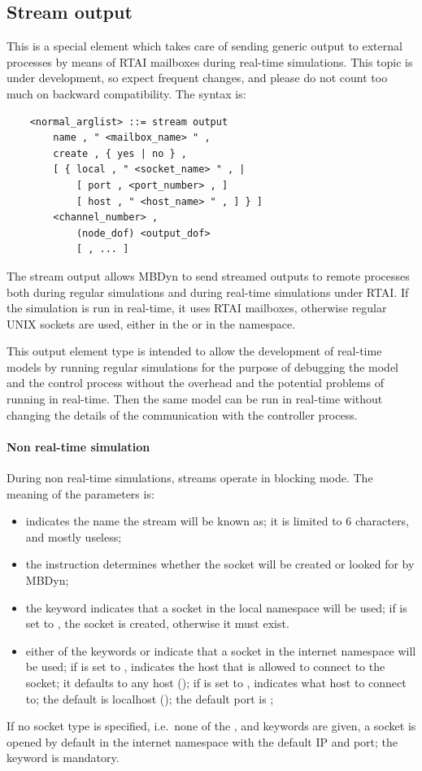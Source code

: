 \subsection{Stream output}\label{sec:STREAM_OUTPUT}
This is a special element which takes care of sending generic output
to external processes by means of RTAI mailboxes during real-time 
simulations.
This topic is under development, so expect frequent changes, and
please do not count too much on backward compatibility.
The syntax is:
\begin{verbatim}
    <normal_arglist> ::= stream output
        name , " <mailbox_name> " ,
        create , { yes | no } ,
        [ { local , " <socket_name> " , |
            [ port , <port_number> , ]
            [ host , " <host_name> " , ] } ]
        <channel_number> ,
            (node_dof) <output_dof>
            [ , ... ]
\end{verbatim}
The stream output allows MBDyn to send streamed outputs 
to remote processes both during regular simulations and during 
real-time simulations under RTAI.
If the simulation is run in real-time, it uses RTAI mailboxes, 
otherwise regular UNIX sockets are used, either in the  or 
in the  namespace.

This output element type is intended to allow the development 
of real-time models by running regular simulations for the purpose 
of debugging the model and the control process without the overhead 
and the potential problems of running in real-time.
Then the same model can be run in real-time without changing the details
of the communication with the controller process.

\paragraph{Non real-time simulation}
During non real-time simulations, streams operate in blocking mode.
The meaning of the parameters is:
\begin{itemize}
\item {} indicates the name the stream
will be known as; it is limited to 6 characters, and mostly useless;
\item the instruction  determines whether the socket will be
created or looked for by MBDyn;
\item the keyword  indicates that a socket 
in the local namespace will be used; if  is set to ,
the socket is created, otherwise it must exist.
\item either of the keywords  or  indicate that a socket
in the internet namespace will be used;
if  is set to ,  indicates 
the host that is allowed to connect to the socket; it defaults 
to any host (); if  is set to ,
 indicates what host to connect to; the default 
is localhost (); the default port is ;
\end{itemize}
If no socket type is specified, i.e.\ none of the ,  
and  keywords are given, a socket is opened by default 
in the internet namespace with the default IP and port; the 
keyword is mandatory.

